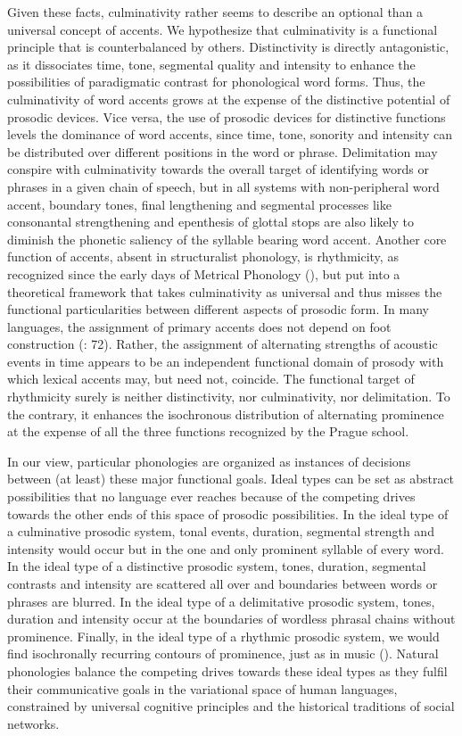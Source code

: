 \documentclass[output=paper]{LSP/langsci}
\begin{document}
Given these facts, culminativity rather seems to describe an optional than a universal concept of accents. We hypothesize that culminativity is a functional principle that is counterbalanced by others. Distinctivity is directly antagonistic, as it dissociates time, tone, segmental quality and intensity to enhance the possibilities of paradigmatic contrast for phonological word forms. Thus, the culminativity of word accents grows at the expense of the distinctive potential of prosodic devices. Vice versa, the use of prosodic devices for distinctive functions levels the dominance of word accents, since time, tone, sonority and intensity can be distributed over different positions in the word or phrase. Delimitation may conspire with culminativity towards the overall target of identifying words or phrases in a given chain of speech, but in all systems with non-peripheral word accent, boundary tones, final lengthening and segmental processes like consonantal strengthening and epenthesis of glottal stops are also likely to diminish the phonetic saliency of the syllable bearing word accent. Another core function of accents, absent in structuralist phonology, is rhythmicity, as recognized since the early days of Metrical Phonology (\citealt{Liberman1977,Hayes1995}), but put into a theoretical framework that takes culminativity as universal and thus misses the functional particularities between different aspects of prosodic form. In many languages, the assignment of primary accents does not depend on foot construction (\citealt{Hulst1999}: 72). Rather, the assignment of alternating strengths of acoustic events in time appears to be an independent functional domain of prosody with which lexical accents may, but need not, coincide. The functional target of rhythmicity surely is neither distinctivity, nor culminativity, nor delimitation. To the contrary, it enhances the isochronous distribution of alternating prominence at the expense of all the three functions recognized by the Prague school.

In our view, particular phonologies are organized as instances of decisions between (at least) these major functional goals. Ideal types can be set as abstract possibilities that no language ever reaches because of the competing drives towards the other ends of this space of prosodic possibilities. In the ideal type of a culminative prosodic system, tonal events, duration, segmental strength and intensity would occur but in the one and only prominent syllable of every word. In the ideal type of a distinctive prosodic system, tones, duration, segmental contrasts and intensity are scattered all over and boundaries between words or phrases are blurred. In the ideal type of a delimitative prosodic system, tones, duration and intensity occur at the boundaries of wordless phrasal chains without prominence. Finally, in the ideal type of a rhythmic prosodic system, we would find isochronally recurring contours of prominence, just as in music (\citealt{Reich2014}). Natural phonologies balance the competing drives towards these ideal types as they fulfil their communicative goals in the variational space of human languages, constrained by universal cognitive principles and the historical traditions of social networks. 
\end{document}
